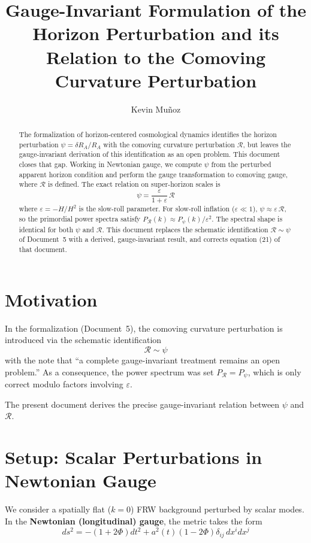 \documentclass[12pt,a4paper]{article}
\title{Gauge-Invariant Formulation of the Horizon Perturbation and its Relation to the Comoving Curvature Perturbation}
\author{Kevin Mu\~noz}
\date{}
\begin{document}
\maketitle

\begin{abstract}
The formalization of horizon-centered cosmological dynamics identifies the horizon perturbation $\psi = \delta R_A / R_A$ with the comoving curvature perturbation $\mathcal{R}$, but leaves the gauge-invariant derivation of this identification as an open problem. This document closes that gap. Working in Newtonian gauge, we compute $\psi$ from the perturbed apparent horizon condition and perform the gauge transformation to comoving gauge, where $\mathcal{R}$ is defined. The exact relation on super-horizon scales is
\[
\psi = \frac{\varepsilon}{1 + \varepsilon}\,\mathcal{R}
\]
where $\varepsilon = -\dot{H}/H^2$ is the slow-roll parameter. For slow-roll inflation ($\varepsilon \ll 1$), $\psi \approx \varepsilon\,\mathcal{R}$, so the primordial power spectra satisfy $P_\mathcal{R}(k) \approx P_\psi(k)/\varepsilon^2$. The spectral shape is identical for both $\psi$ and $\mathcal{R}$. This document replaces the schematic identification $\mathcal{R} \sim \psi$ of Document~5 with a derived, gauge-invariant result, and corrects equation (21) of that document.
\end{abstract}

\section{Motivation}

In the formalization (Document~5), the comoving curvature perturbation is introduced via the schematic identification
\begin{equation}
\mathcal{R} \sim \psi \tag{1}
\end{equation}
with the note that ``a complete gauge-invariant treatment remains an open problem.'' As a consequence, the power spectrum was set $P_\mathcal{R} = P_\psi$, which is only correct modulo factors involving $\varepsilon$.

The present document derives the precise gauge-invariant relation between $\psi$ and $\mathcal{R}$.

\section{Setup: Scalar Perturbations in Newtonian Gauge}

We consider a spatially flat ($k=0$) FRW background perturbed by scalar modes. In the \textbf{Newtonian (longitudinal) gauge}, the metric takes the form
\begin{equation}
ds^2 = -(1 + 2\Phi)dt^2 + a^2(t)(1 - 2\Phi)\delta_{ij}\,dx^i dx^j \tag{2}
\end{equation}
\end{document}
